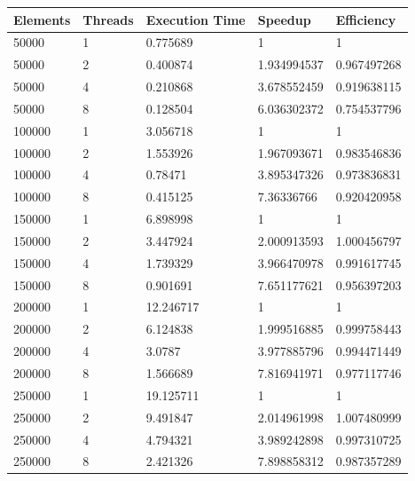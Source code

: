 \begin{table}[H]
    \centering
    \begin{tabular}{|l|l|l|l|l|}\hline
        Elements & Threads & Execution Time & Speedup & Efficiency \\\hline
        50000 & 1 & 0.775689 & 1 & 1 \\
        50000 & 2 & 0.400874 & 1.934994537 & 0.967497268\\
        50000 & 4 & 0.210868 & 3.678552459 & 0.919638115\\
        50000 & 8 & 0.128504 & 6.036302372 & 0.754537796\\\hline
        100000 & 1 & 3.056718 & 1 & 1\\
        100000 & 2 & 1.553926 & 1.967093671 & 0.983546836\\
        100000 & 4 & 0.78471 & 3.895347326 & 0.973836831\\
        100000 & 8 & 0.415125 & 7.36336766 & 0.920420958\\\hline
        150000 & 1 & 6.898998 & 1 & 1\\
        150000 & 2 & 3.447924 & 2.000913593 & 1.000456797\\
        150000 & 4 & 1.739329 & 3.966470978 & 0.991617745\\
        150000 & 8 & 0.901691 & 7.651177621 & 0.956397203\\\hline
        200000 & 1 & 12.246717 & 1 & 1\\
        200000 & 2 & 6.124838 & 1.999516885 & 0.999758443\\
        200000 & 4 & 3.0787 & 3.977885796 & 0.994471449\\
        200000 & 8 & 1.566689 & 7.816941971 & 0.977117746\\\hline
        250000 & 1 & 19.125711 & 1 & 1\\
        250000 & 2 & 9.491847 & 2.014961998 & 1.007480999\\
        250000 & 4 & 4.794321 & 3.989242898 & 0.997310725\\
        250000 & 8 & 2.421326 & 7.898858312 & 0.987357289\\\hline
        
        
    \end{tabular}
    \label{tab:Quicksort_Table}
\end{table}

